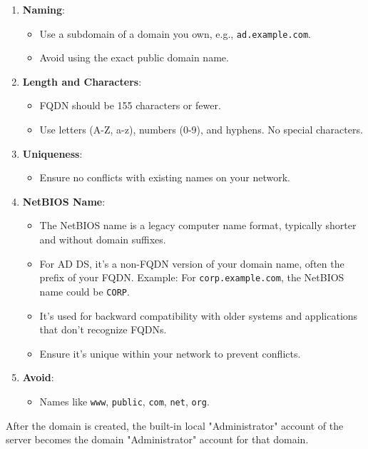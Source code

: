 \documentclass{article}
\begin{document}
\begin{enumerate}
\item \textbf{Naming}:
\begin{itemize}
        \item Use a subdomain of a domain you own, e.g., \texttt{ad.example.com}.
        \item Avoid using the exact public domain name.
\end{itemize}

\item \textbf{Length and Characters}:
\begin{itemize}
        \item FQDN should be 155 characters or fewer.
        \item Use letters (A-Z, a-z), numbers (0-9), and hyphens. No special characters.
\end{itemize}

\item \textbf{Uniqueness}:
\begin{itemize}
        \item Ensure no conflicts with existing names on your network.
\end{itemize}

\item \textbf{NetBIOS Name}:
\begin{itemize}
    \item The NetBIOS name is a legacy computer name format, typically shorter and without domain suffixes.
    \item For AD DS, it's a non-FQDN version of your domain name, often the prefix of your FQDN. Example: For \texttt{corp.example.com}, the NetBIOS name could be \texttt{CORP}.
    \item It's used for backward compatibility with older systems and applications that don't recognize FQDNs.
    \item Ensure it's unique within your network to prevent conflicts.
\end{itemize}

\item \textbf{Avoid}:
\begin{itemize}
        \item Names like \texttt{www}, \texttt{public}, \texttt{com}, \texttt{net}, \texttt{org}.
\end{itemize}
\end{enumerate}

After the domain is created, the built-in local "Administrator" 
account of the server becomes the domain "Administrator" 
account for that domain.
\end{document}
